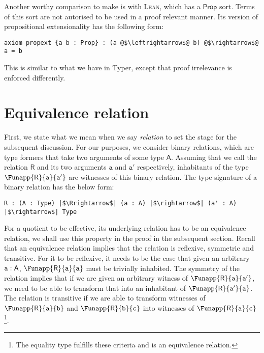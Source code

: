 \documentclass[12pt,twoside,maitrise]{dms}
\theoremstyle{definition}
\numberwithin{equation}{section}
\numberwithin{table}{chapter}
\numberwithin{figure}{chapter}
\newcommand\kw[1] {\textsf{#1}}
\newcommand\id[1] {\texttt{#1}}
\def\Lean{\textsc{Lean}\xspace}
\begin{document}
Another worthy comparison to make is with \Lean{}, which has a $\kw{Prop}$ sort.
Terms of this sort are not autorised to be used in a proof relevant manner. Its
version of propositional extensionality has the following form:

\begin{verbatim}
axiom propext {a b : Prop} : (a @$\leftrightarrow$@ b) @$\rightarrow$@ a = b
\end{verbatim}

This is similar to what we have in Typer, except that proof irrelevance is
enforced differently.

\section{Equivalence relation}

First, we state what we mean when we say \emph{relation} to set the stage for
the subsequent discussion. For our purposes, we consider binary relations, which
are type formers that take two arguments of some type $\kw{A}$. Assuming that we
call the relation $\kw{R}$ and its two arguments $\id{a}$ and $\id{a}'$
respectively, inhabitants of the type $\Funapp{\kw{R}}{\id{a}}{\id{a}'}$ are
witnesses of this binary relation. The type signature of a binary relation has
the below form:

\begin{verbatim}
R : (A : Type) |$\Rrightarrow$| (a : A) |$\rightarrow$| (a' : A) |$\rightarrow$| Type
\end{verbatim}

For a quotient to be effective, its underlying relation has to be an equivalence relation, we shall use this property in the proof in the subsequent section. Recall that an equivalence relation implies that the relation is reflexive, symmetric and transitive. For it to be reflexive, it needs to be the case that given an arbitrary $\oftype{\id{a}}{\kw{A}}$, $\Funapp{\kw{R}}{\id{a}}{\id{a}}$ must be trivially inhabited. The symmetry of the relation implies that if we are given an arbitrary witness of $\Funapp{\kw{R}}{\id{a}}{\id{a}'}$, we need to be able to transform that into an inhabitant of $\Funapp{\kw{R}}{\id{a}'}{\id{a}}$. The relation is transitive if we are able to transform witnesses of $\Funapp{\kw{R}}{\id{a}}{\id{b}}$ and $\Funapp{\kw{R}}{\id{b}}{\id{c}}$ into witnesses of $\Funapp{\kw{R}}{\id{a}}{\id{c}}$\footnote{The equality type fulfills these criteria and is an equivalence relation.}.
\end{document}

